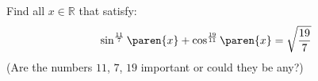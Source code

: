 Find all $x \in \mathbb{R}$ that satisfy:
\begin{equation*}
  \sin^{\frac{11}{7}}\paren{x} + \cos^{\frac{19}{11}}\paren{x} = \sqrt{\frac{19}{7}}
\end{equation*}
(Are the numbers $11$, $7$, $19$ important or could they be any?)
